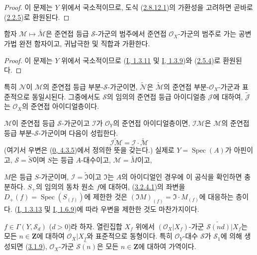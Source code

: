 \begin{proof}
이 문제는 $Y$ 위에서 국소적이므로, 도식
(\hyperref[II.2.8.12.1-ko]{2.8.12.1})의 가환성을 고려하면 곧바로
(\hyperref[II.2.2.5-ko]{2.2.5})로 환원된다.
\end{proof}

\begin{proposition}[3.2.4]
\label{II.3.2.4-ko}
함자 $\mathcal{M}\mapsto\widetilde{\mathcal{M}}$은 준연접 등급
$\mathcal{S}$-가군의 범주에서 준연접 $\mathcal{O}_X$-가군의 범주로
가는 공변 가법 완전 함자이고, 귀납극한 및 직합과 가환한다.
\end{proposition}

\begin{proof}
이 문제는 $Y$ 위에서 국소적이므로
(\hyperref[I.1.3.11-ko]{I, 1.3.11} 및
\hyperref[I.1.3.9-ko]{I, 1.3.9})와
(\hyperref[II.2.5.4-ko]{2.5.4})로 환원된다.
\end{proof}

특히 $\mathcal{N}$이 $\mathcal{M}$의 준연접 등급
부분-$\mathcal{S}$-가군이면, $\widetilde{\mathcal{N}}$은
$\widetilde{\mathcal{M}}$의 준연접 부분-$\mathcal{O}_X$-가군과
표준적으로 동일시된다. 그중에서도 $\mathcal{S}$의 임의의 준연접 등급
아이디얼층 $\mathcal{J}$에 대하여, $\widetilde{\mathcal{J}}$는
$\mathcal{O}_X$의 준연접 아이디얼층이다.

$\mathcal{M}$이 준연접 등급 $\mathcal{S}$-가군이고
$\mathcal{I}$가 $\mathcal{O}_Y$의 준연접 아이디얼층이면,
$\mathcal{I}\mathcal{M}$은 $\mathcal{M}$의 준연접 등급
부분-$\mathcal{S}$-가군이며 다음이 성립한다.
\[
\label{II.3.2.4.1-ko}
  \widetilde{\mathcal{I}\mathcal{M}}
  =\mathcal{I}\cdot\widetilde{\mathcal{M}}
\tag{3.2.4.1}
\]
(여기서 우변은 (\hyperref[0.4.3.5-ko]{0, 4.3.5})에서 정의한 뜻을
갖는다.) 실제로 $Y=\operatorname{Spec}(A)$가 아핀이고,
$\mathcal{S}=\widetilde{S}$이며 $S$는 등급 $A$-대수이고,
$\mathcal{M}=\widetilde{M}$이고,


$M$은 등급 $S$-가군이며, $\mathcal{I}=\widetilde{\mathfrak{I}}$이고
$\mathfrak{I}$는 $A$의 아이디얼인 경우에 이 공식을 확인하면 충분하다.
$S_+$의 임의의 동차 원소 $f$에 대하여,
(\hyperref[II.3.2.4.1-ko]{3.2.4.1})의 좌변을
$D_+(f)=\operatorname{Spec}(S_{(f)})$에 제한한 것은
$(\mathfrak{I}M)_{(f)}=\mathfrak{I}\cdot M_{(f)}$에 대응하는 층이다.
(\hyperref[I.1.3.13-ko]{I, 1.3.13} 및
\hyperref[I.1.6.9-ko]{I, 1.6.9})에 따라 우변을 제한한 것도 마찬가지이다.

\begin{proposition}[3.2.5]
\label{II.3.2.5-ko}
$f\in\Gamma(Y,\mathcal{S}_d)$ ($d>0$)라 하자. 열린집합 $X_f$ 위에서
$(\mathcal{O}_X|X_f)$-가군 $\widetilde{\mathcal{S}(nd)}|X_f$는 모든
$n\in\mathbf{Z}$에 대하여 $\mathcal{O}_X|X_f$와 표준적으로 동형이다.
특히 $\mathcal{O}_Y$-대수 $\mathcal{S}$가 $\mathcal{S}_1$에 의해
생성되면 (\hyperref[II.3.1.9-ko]{3.1.9}), $\mathcal{O}_X$-가군
$\widetilde{\mathcal{S}(n)}$은 모든 $n\in\mathbf{Z}$에 대하여
가역이다.
\end{proposition}

